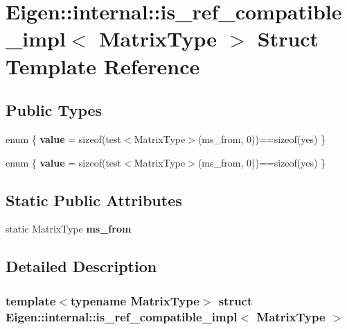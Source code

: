 \hypertarget{struct_eigen_1_1internal_1_1is__ref__compatible__impl}{}\section{Eigen\+:\+:internal\+:\+:is\+\_\+ref\+\_\+compatible\+\_\+impl$<$ Matrix\+Type $>$ Struct Template Reference}
\label{struct_eigen_1_1internal_1_1is__ref__compatible__impl}
\subsection*{Public Types}
\begin{DoxyCompactItemize}
\item 
\mbox{\label{struct_eigen_1_1internal_1_1is__ref__compatible__impl_a947c489686c8a88d92cc7241c6a87dc0}} 
enum \{ {\bfseries value} = sizeof(test$<$Matrix\+Type$>$(ms\+\_\+from, 0))==sizeof(yes)
 \}
\item 
\mbox{\label{struct_eigen_1_1internal_1_1is__ref__compatible__impl_a3c11c66f86ab23c81a4ca87b5a03d7fb}} 
enum \{ {\bfseries value} = sizeof(test$<$Matrix\+Type$>$(ms\+\_\+from, 0))==sizeof(yes)
 \}
\end{DoxyCompactItemize}
\subsection*{Static Public Attributes}
\begin{DoxyCompactItemize}
\item 
\mbox{\label{struct_eigen_1_1internal_1_1is__ref__compatible__impl_ad4cf2153faa7b3e9ec7ddfe517ebf883}} 
static Matrix\+Type {\bfseries ms\+\_\+from}
\end{DoxyCompactItemize}


\subsection{Detailed Description}
\subsubsection*{template$<$typename Matrix\+Type$>$\newline
struct Eigen\+::internal\+::is\+\_\+ref\+\_\+compatible\+\_\+impl$<$ Matrix\+Type $>$}



